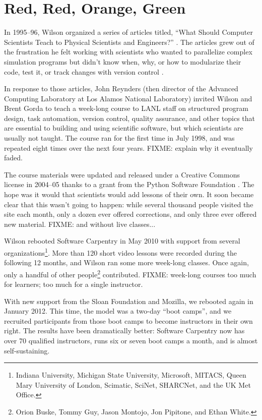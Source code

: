 \documentclass{article}
\begin{document}
\section{Red, Red, Orange, Green}

In 1995--96,
Wilson organized a series of articles titled,
``What Should Computer Scientists Teach to Physical Scientists and Engineers?''
\cite{wilson1996}.
The articles grew out of the frustration he felt working with scientists
who wanted to parallelize complex simulation programs
but didn't know when, why, or how to modularize their code,
test it,
or track changes with version control
\cite{wilson2006a}.

In response to those articles,
John Reynders
(then director of the Advanced Computing Laboratory at Los Alamos National Laboratory)
invited Wilson and Brent Gorda to teach
a week-long course to LANL staff
on structured program design,
task automation,
version control,
quality assurance,
and other topics that are essential to building and using scientific software,
but which scientists are usually not taught.
The course ran for the first time in July 1998,
and was repeated eight times over the next four years.
FIXME: explain why it eventually faded.

The course materials were updated and released under a Creative Commons license in 2004--05
thanks to a grant from the Python Software Foundation \cite{wilson2006b}.
The hope was it would that scientists would add lessons of their own.
It soon became clear that this wasn't going to happen:
while several thousand people visited the site each month,
only a dozen ever offered corrections,
and only three ever offered new material.
FIXME: and without live classes...

Wilson rebooted Software Carpentry in May 2010
with support from several organizations\footnote{Indiana University,
Michigan State University,
Microsoft,
MITACS,
Queen Mary University of London,
Scimatic,
SciNet,
SHARCNet,
and the UK Met Office.}.
More than 120 short video lessons were recorded during the following 12 months,
and Wilson ran some more week-long classes.
Once again,
only a handful of other people\footnote{Orion Buske, Tommy Guy, Jason Montojo, Jon Pipitone, and Ethan White.} contributed.
FIXME: week-long courses too much for learners; too much for a single instructor.

With new support from the Sloan Foundation and Mozilla,
we rebooted again in January 2012.
This time,
the model was a two-day ``boot camps'',
and we recruited participants from those boot camps
to become instructors in their own right.
The results have been dramatically better:
Software Carpentry now has over 70 qualified instructors,
runs six or seven boot camps a month,
and is almost self-sustaining.
\end{document}
